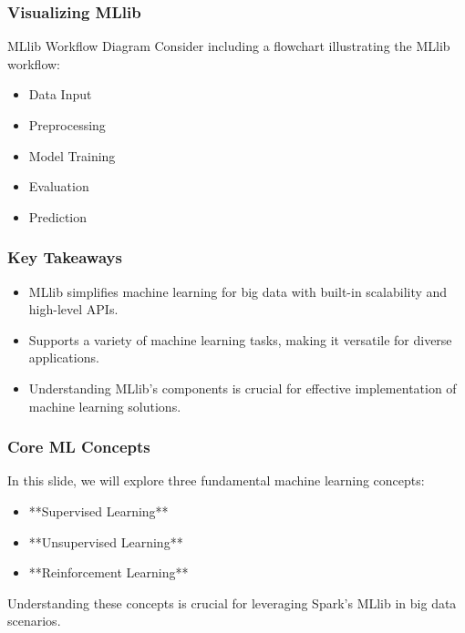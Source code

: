 \documentclass[aspectratio=169]{beamer}
\begin{document}
\begin{frame}[fragile]
    \frametitle{Visualizing MLlib}
    \begin{block}{MLlib Workflow Diagram}
        Consider including a flowchart illustrating the MLlib workflow:
        \begin{itemize}
            \item Data Input
            \item Preprocessing
            \item Model Training
            \item Evaluation
            \item Prediction
        \end{itemize}
    \end{block}
\end{frame}

\begin{frame}[fragile]
    \frametitle{Key Takeaways}
    \begin{itemize}
        \item MLlib simplifies machine learning for big data with built-in scalability and high-level APIs.
        \item Supports a variety of machine learning tasks, making it versatile for diverse applications.
        \item Understanding MLlib's components is crucial for effective implementation of machine learning solutions.
    \end{itemize}
\end{frame}

\begin{frame}[fragile]
    \frametitle{Core ML Concepts}
    In this slide, we will explore three fundamental machine learning concepts: 
    \begin{itemize}
        \item **Supervised Learning**
        \item **Unsupervised Learning**
        \item **Reinforcement Learning**
    \end{itemize}
    Understanding these concepts is crucial for leveraging Spark's MLlib in big data scenarios.
\end{frame}
\end{document}
